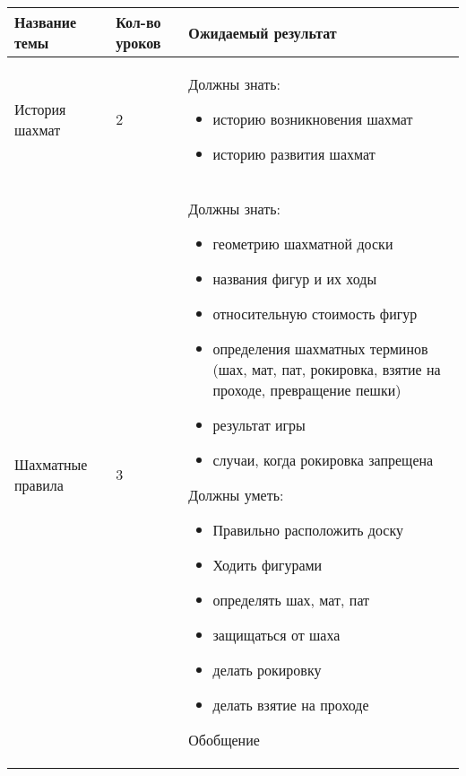 \begin{center}
\begin{longtable}{ p{} | p{} | p{} }
Название темы & Кол-во уроков & Ожидаемый результат \\ \hline
История шахмат & 2 & Должны знать:

\begin{itemize}
\item историю возникновения шахмат
\item историю развития шахмат
\end{itemize} \\ \hline
Шахматные правила & 3 & Должны знать:

\begin{itemize}
\item геометрию шахматной доски
\item названия фигур и их ходы 
\item относительную стоимость фигур
\item определения шахматных терминов (шах, мат, пат, рокировка, взятие на проходе, превращение пешки)
\item результат игры
\item случаи, когда рокировка запрещена
\end{itemize}

Должны уметь:

\begin{itemize}
\item Правильно расположить доску
\item Ходить фигурами
\item определять шах, мат, пат
\item защищаться от шаха
\item делать рокировку
\item делать взятие на проходе
\end{itemize}

Обобщение


\end{longtable}
\end{center}
